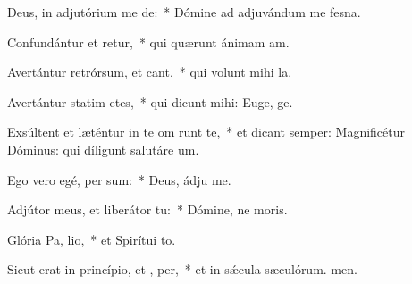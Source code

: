 \item Deus, in adjutórium me de:~* Dómine ad adjuvándum me fesna.
\item Confundántur et retur,~* qui quærunt ánimam am.
\item Avertántur retrórsum, et cant,~* qui volunt mihi la.
\item Avertántur statim etes,~* qui dicunt mihi: Euge, ge.
\item Exsúltent et læténtur in te om  runt te,~* et dicant semper: Magnificétur Dóminus: qui díligunt salutáre um.
\item Ego vero egé,  per sum:~* Deus, ádju me.
\item Adjútor meus, et liberátor   tu:~* Dómine, ne moris.
\item Glória Pa,  lio,~* et Spirítui to.
\item Sicut erat in princípio, et ,  per,~* et in sǽcula sæculórum. men.
